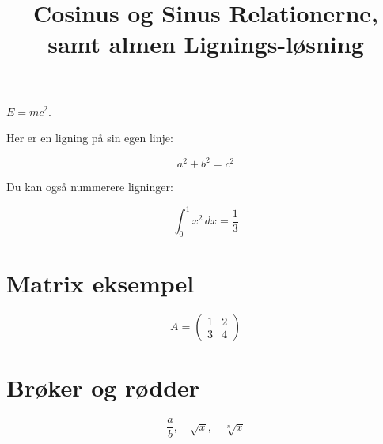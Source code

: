 \documentclass[a4paper,12pt]{article}
\title{Cosinus og Sinus Relationerne, samt almen Lignings-løsning}
\begin{document}
\maketitle
\tableofcontents
\newpage






$E = mc^2$.

Her er en ligning på sin egen linje:

\[
a^2 + b^2 = c^2
\]

Du kan også nummerere ligninger:

\begin{equation}
\int_0^1 x^2 \, dx = \frac{1}{3}
\end{equation}

\section{Matrix eksempel}

\[
A =
\begin{pmatrix}
1 & 2 \\
3 & 4
\end{pmatrix}
\]

\section{Brøker og rødder}

\[
\frac{a}{b}, \quad \sqrt{x}, \quad \sqrt[n]{x}
\]
\end{document}
